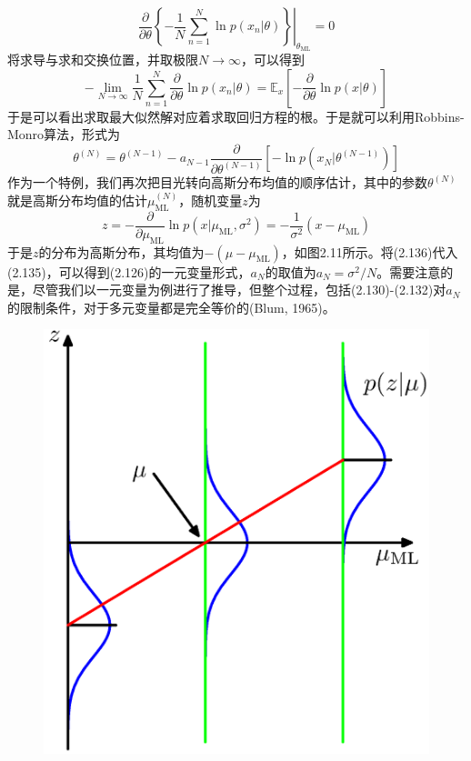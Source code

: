 \documentclass[b5paper]{book}
\numberwithin{equation}{chapter}
\begin{document}
{	\begin{equation}
		\left.\frac{\partial}{\partial\theta}\left\{-\frac{1}{N}\sum_{n=1}^N \ln p(x_n|\theta)\right\}\right|_{\theta_{\mathrm{ML}}}=0
	\end{equation}
	将求导与求和交换位置，并取极限$N \rightarrow \infty$，可以得到
	\begin{equation}
		-\lim_{N\rightarrow\infty}\frac{1}{N}\sum_{n=1}^N\frac{\partial}{\partial\theta}\ln p(x_n|\theta)=\mathbb{E}_x\left[-\frac{\partial}{\partial\theta}\ln p(x|\theta)\right]
	\end{equation}
	于是可以看出求取最大似然解对应着求取回归方程的根。于是就可以利用Robbins-Monro算法，形式为
	\begin{equation}
		\theta^{(N)}=\theta^{(N-1)}-a_{N-1}\frac{\partial}{\partial\theta^{(N-1)}}[-\ln p(x_N|\theta^{(N-1)})]
	\end{equation}
	\indent 作为一个特例，我们再次把目光转向高斯分布均值的顺序估计，其中的参数$\theta^{(N)}$就是高斯分布均值的估计$\mu_{\mathrm{ML}}^{(N)}$，随机变量$z$为
	\begin{equation}
		z=-\frac{\partial}{\partial\mu_{\mathrm{ML}}}\ln p(x|\mu_{\mathrm{ML}},\sigma^2)=-\frac{1}{\sigma^2}(x-\mu_{\mathrm{ML}})
	\end{equation}
	于是$z$的分布为高斯分布，其均值为$-(\mu-\mu_{\mathrm{ML}})$，如图2.11所示。将(2.136)代入(2.135)，可以得到(2.126)的一元变量形式，$a_N$的取值为$a_N=\sigma^2/N$。需要注意的是，尽管我们以一元变量为例进行了推导，但整个过程，包括(2.130)-(2.132)对$a_N$的限制条件，对于多元变量都是完全等价的(Blum, 1965)。
	\begin{figure}[ht]
		\centering
		\includegraphics[scale=0.8]{Images/2-11.png}

\end{figure}}
\end{document}
